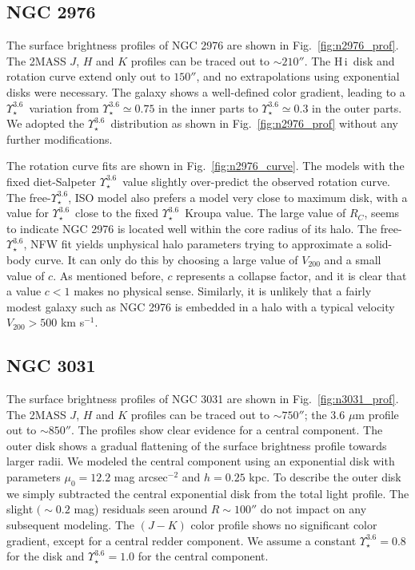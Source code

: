 \documentclass[usenatbib,usegraphicx,apjfonts,floatfix]{emulateapj}
\newcommand{\HI}{H\,{\sc i}}
\newcommand{\Ups}{\ensuremath{\Upsilon_{\star}^{3.6}}}
\begin{document}
\subsection{NGC 2976}

The surface brightness profiles of NGC 2976 are shown in
Fig.~\ref{fig:n2976_prof}. The 2MASS $J$, $H$ and $K$ profiles can be
traced out to $\sim 210''$. The \HI\ disk and rotation curve extend
only out to $150''$, and no extrapolations using exponential disks
were necessary. The galaxy shows a well-defined color gradient,
leading to a \Ups\ variation from $\Ups \simeq 0.75$ in the inner
parts to $\Ups \simeq 0.3$ in the outer parts. We adopted the \Ups\
distribution as shown in Fig.~\ref{fig:n2976_prof} without any further
modifications.

The rotation curve fits are shown in Fig.~\ref{fig:n2976_curve}.  The
models with the fixed diet-Salpeter \Ups\ value slightly over-predict
the observed rotation curve. The free-\Ups, ISO model also prefers a
model very close to maximum disk, with a value for \Ups\ close to the
fixed \Ups\ Kroupa value.  The large value of $R_C$, seems to indicate
NGC 2976 is located well within the core radius of its halo.  The
free-\Ups, NFW fit yields unphysical halo parameters trying to
approximate a solid-body curve.  It can only do this by choosing a
large value of $V_{200}$ and a small value of $c$.  As mentioned
before, $c$ represents a collapse factor, and it is clear that a value
$c<1$ makes no physical sense. Similarly, it is unlikely that a fairly
modest galaxy such as NGC 2976 is embedded in a halo with a typical
velocity $V_{200} > 500$ km s$^{-1}$.

\subsection{NGC 3031}

The surface brightness profiles of NGC 3031 are shown in
Fig.~\ref{fig:n3031_prof}. The 2MASS $J$, $H$ and $K$ profiles can be
traced out to $\sim 750''$; the 3.6 $\mu$m profile out to $\sim
850''$.  The profiles show clear evidence for a central component.
The outer disk shows a gradual flattening of the surface brightness
profile towards larger radii. We modeled the central component using
an exponential disk with parameters $\mu_0=12.2$ mag arcsec$^{-2}$
and $h=0.25$ kpc.  To describe the outer disk we simply subtracted the
central exponential disk from the total light profile.  The slight
$(\sim 0.2$ mag) residuals seen around $R\sim 100''$ do not impact on
any subsequent modeling.  The $(J-K)$ color profile shows no
significant color gradient, except for a central redder component. We
assume a constant $\Ups=0.8$ for the disk and $\Ups=1.0$ for the
central component.
\end{document}
